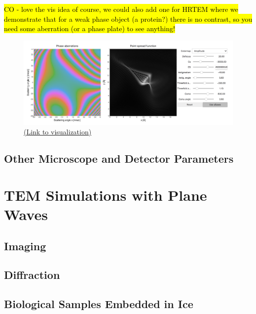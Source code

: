 \documentclass[%
 superscriptaddress,
 aip,
 amsmath,amssymb,
preprint,%
 author-year,%
longbibliography
]{revtex4-2}
\begin{document}
\hl{CO - love the vis idea of course, we could also add one for HRTEM where we demonstrate that for a weak phase object (a protein?) there is no contrast, so you need some aberration (or a phase plate) to see anything! }





\begin{figure}[h]
    \includegraphics[width=1\textwidth]{figures/aberrations_and_psf.png}
    \caption{\href{https://tem-elements.herokuapp.com/voila/render/notebooks/Aberrations.ipynb}{(Link to visualization)}}
\end{figure}







\subsection*{Other Microscope and Detector Parameters}

\section*{TEM Simulations with Plane Waves}\label{TEM_SIMS}

\subsection*{Imaging}

\subsection*{Diffraction}

\subsection*{Biological Samples Embedded in Ice}
\end{document}
